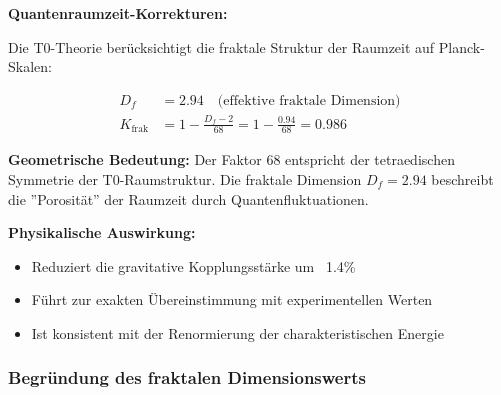 \documentclass[12pt,a4paper]{article}
\begin{document}
	\begin{derivation}
		\textbf{Quantenraumzeit-Korrekturen:}
		
		Die T0-Theorie berücksichtigt die fraktale Struktur der Raumzeit auf Planck-Skalen:
		
		\begin{align}
			D_f &= 2.94 \quad \text{(effektive fraktale Dimension)} \\
			K_{\text{frak}} &= 1 - \frac{D_f - 2}{68} = 1 - \frac{0.94}{68} = 0.986
		\end{align}
		
		\textbf{Geometrische Bedeutung:} 
		Der Faktor 68 entspricht der tetraedischen Symmetrie der T0-Raumstruktur. Die fraktale Dimension $D_f = 2.94$ beschreibt die ''Porosität'' der Raumzeit durch Quantenfluktuationen.
		
		\textbf{Physikalische Auswirkung:}
		\begin{itemize}
			\item Reduziert die gravitative Kopplungsstärke um ~1.4\%
			\item Führt zur exakten Übereinstimmung mit experimentellen Werten
			\item Ist konsistent mit der Renormierung der charakteristischen Energie
		\end{itemize}
	\end{derivation}
	
	\subsubsection{Begründung des fraktalen Dimensionswerts}
	
\end{document}
